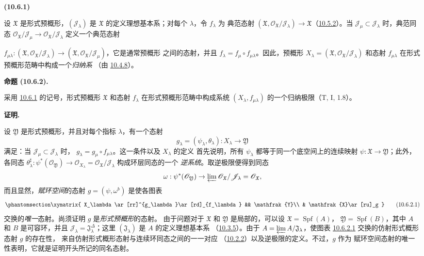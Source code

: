 \documentclass[UTF8,fontset=none,11pt,oneside,openany]{ctexbook}
\newenvironment{env}[1][]{%
  \par\medskip\noindent\textbf{(#1)}\ %
}{\par}
\newenvironment{proposition}[1][]{%
  \par\medskip\noindent\textbf{命题 (#1).}\ %
}{\par}
\newenvironment{proof}{%
  \par\medskip\noindent\textbf{证明.}\ %
}{\par}
\newcommand{\oldpage}[2][]{%
  \hypertarget{ega-source-page-#1-#2}{}%
  \marginnote{\scriptsize\textbf{#1}~|~#2}\ignorespaces}
\let\EGAOriginalLabel\label
\renewcommand{\label}[1]{\phantomsection\EGAOriginalLabel{#1}}
\begin{document}
\begin{env}[10.6.1]
\label{I.10.6.1-fr}
设 $\mathfrak{X}$ 是形式预概形，$(\mathscr{J}_\lambda)$ 是
$\mathfrak{X}$ 的定义理想基本系；对每个 $\lambda$，令 $f_\lambda$ 为
典范态射
$(\mathfrak{X},\mathscr{O}_{\mathfrak{X}}/\mathscr{J}_\lambda)
\to\mathfrak{X}$（\hyperref[I.10.5.2-fr]{10.5.2}）。当
$\mathscr{J}_\mu\subset\mathscr{J}_\lambda$ 时，典范同态
$\mathscr{O}_{\mathfrak{X}}/\mathscr{J}_\mu\to
\mathscr{O}_{\mathfrak{X}}/\mathscr{J}_\lambda$ 定义一个典范态射

\oldpage[I]{189}

$f_{\mu\lambda}:(\mathfrak{X},
\mathscr{O}_{\mathfrak{X}}/\mathscr{J}_\lambda)\to
(\mathfrak{X},\mathscr{O}_{\mathfrak{X}}/\mathscr{J}_\mu)$，它是通常预概形
之间的态射，并且 $f_\lambda=f_\mu\circ f_{\mu\lambda}$。因此，预概形
$X_\lambda=(\mathfrak{X},
\mathscr{O}_{\mathfrak{X}}/\mathscr{J}_\lambda)$ 和态射
$f_{\mu\lambda}$ 在形式预概形范畴中构成一个\emph{归纳系}
（由 \hyperref[I.10.4.8-fr]{10.4.8}）。
\end{env}

\begin{proposition}[10.6.2]
\label{I.10.6.2-fr}
采用 \hyperref[I.10.6.1-fr]{10.6.1} 的记号，形式预概形
$\mathfrak{X}$ 和态射 $f_\lambda$ 在形式预概形范畴中构成系统
$(X_\lambda,f_{\mu\lambda})$ 的一个归纳极限（T, I, 1.8）。
\end{proposition}

\begin{proof}
设 $\mathfrak{Y}$ 是形式预概形，并且对每个指标 $\lambda$，有一个态射
\[
  g_\lambda=(\psi_\lambda,\theta_\lambda):X_\lambda\to\mathfrak{Y}
\]
满足：当 $\mathscr{J}_\mu\subset\mathscr{J}_\lambda$ 时，
$g_\lambda=g_\mu\circ f_{\mu\lambda}$。这一条件以及 $X_\lambda$ 的定义
首先说明，所有 $\psi_\lambda$ 都等于同一个底空间上的连续映射
$\psi:\mathfrak{X}\to\mathfrak{Y}$；此外，各同态
$\theta_\lambda^\sharp:\psi^*(\mathscr{O}_{\mathfrak{Y}})\to
\mathscr{O}_{X_\lambda}=
\mathscr{O}_{\mathfrak{X}}/\mathscr{J}_\lambda$ 构成环层同态的一个
\emph{逆系统}。取逆极限便得到同态
\[
  \omega:\psi^*(\mathscr{O}_{\mathfrak{Y}})\to
  \varprojlim\mathscr{O}_{\mathfrak{X}}/\mathscr{J}_\lambda
  =\mathscr{O}_{\mathfrak{X}},
\]
而且显然，\emph{赋环空间}的态射 $g=(\psi,\omega^b)$ 是使各图表
\[
  \label{I.10.6.2.1-fr}
  \xymatrix{
    X_\lambda\ar[rr]^{g_\lambda}\ar[rd]_{f_\lambda} &&
    \mathfrak{Y}\\
    & \mathfrak{X}\ar[ru]_g
  }
  \tag{10.6.2.1}
\]
交换的\emph{唯一}态射。尚须证明 $g$ 是\emph{形式预概形}的态射。
由于问题对于 $\mathfrak{X}$ 和 $\mathfrak{Y}$ 是局部的，可以设
$\mathfrak{X}=\operatorname{Spf}(A)$，
$\mathfrak{Y}=\operatorname{Spf}(B)$，其中 $A$ 和 $B$ 是可容环，并且
$\mathscr{J}_\lambda=\mathfrak{J}_\lambda^{\Delta}$；这里
$(\mathfrak{J}_\lambda)$ 是 $A$ 的定义理想基本系
（\hyperref[I.10.3.5-fr]{10.3.5}）。由于
$A=\varprojlim A/\mathfrak{J}_\lambda$，使图表
\hyperref[I.10.6.2.1-fr]{10.6.2.1} 交换的仿射形式概形态射 $g$ 的存在性，
来自仿射形式概形态射与连续环同态之间的一一对应
（\hyperref[I.10.2.2-fr]{10.2.2}）以及逆极限的定义。不过，$g$ 作为
赋环空间态射的唯一性表明，它就是证明开头所记的同名态射。
\end{proof}
\end{document}
